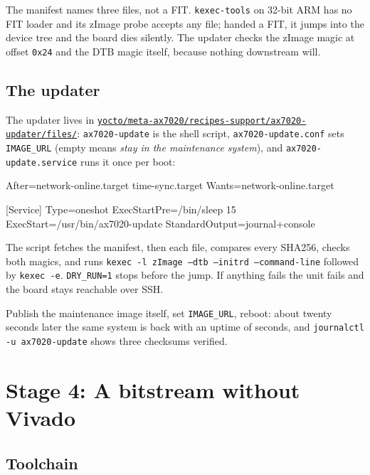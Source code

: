 \documentclass[11pt,a4paper,oneside]{article}
\newcommand{\file}[1]{{\color{bluemid}\nolinkurl{#1}}}
\newcommand{\cmd}[1]{\texttt{#1}}
\newcommand{\repo}{https://github.com/MaxClerkwell/ax7020-bringup}
\newcommand{\rfile}[1]{\href{\repo/blob/master/#1}{\color{bluemid}\nolinkurl{#1}}}
\begin{document}
\begin{mustknow}
The manifest names three files, not a FIT. \cmd{kexec-tools} on 32-bit ARM
has no FIT loader and its zImage probe accepts any file; handed a FIT, it
jumps into the device tree and the board dies silently. The updater checks
the zImage magic at offset \cmd{0x24} and the DTB magic itself, because
nothing downstream will.
\end{mustknow}

\subsection{The updater}

The updater lives in \rfile{yocto/meta-ax7020/recipes-support/ax7020-updater/files/}:
\file{ax7020-update} is the shell script, \file{ax7020-update.conf} sets
\cmd{IMAGE\_URL} (empty means \emph{stay in the maintenance system}), and
\file{ax7020-update.service} runs it once per boot:

\begin{code}
[Unit]
After=network-online.target time-sync.target
Wants=network-online.target

[Service]
Type=oneshot
ExecStartPre=/bin/sleep 15
ExecStart=/usr/bin/ax7020-update
StandardOutput=journal+console
\end{code}

The script fetches the manifest, then each file, compares every SHA256, checks
both magics, and runs \cmd{kexec -l zImage --dtb --initrd --command-line} followed
by \cmd{kexec -e}. \cmd{DRY\_RUN=1} stops before the jump. If anything fails the
unit fails and the board stays reachable over SSH.

\begin{checkpoint}
Publish the maintenance image itself, set \cmd{IMAGE\_URL}, reboot: about
twenty seconds later the same system is back with an uptime of seconds, and
\cmd{journalctl -u ax7020-update} shows three checksums verified.
\end{checkpoint}

\section{Stage 4: A bitstream without Vivado}

\subsection{Toolchain}
\end{document}
